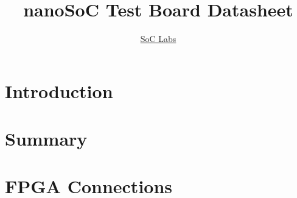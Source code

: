 \documentclass{article}
\title{nanoSoC Test Board Datasheet}
\author{\href{http://www.soclabs.org}{SoC Labs}}
\begin{document}
\maketitle

\tableofcontents
\clearpage
\section{Introduction}

\section{Summary}

\section{FPGA Connections}
\end{document}

